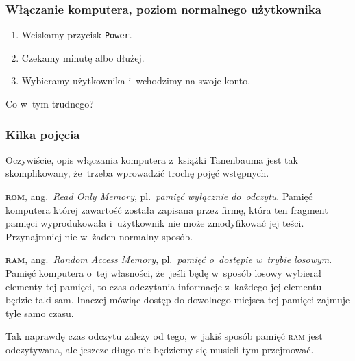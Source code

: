 \documentclass[10pt,t]{beamer}
\begin{document}
\begin{frame}
  \frametitle{Włączanie komputera, poziom normalnego użytkownika}


  \begin{enumerate}

  \item Wciskamy przycisk \texttt{Power}.



  \item Czekamy minutę albo dłużej.



  \item Wybieramy użytkownika i~wchodzimy na swoje konto.

  \end{enumerate}

  Co w~tym trudnego?

\end{frame}





\begin{frame}
  \frametitle{Kilka pojęcia}


  Oczywiście, opis włączania komputera z~książki Tanenbauma jest tak
  skomplikowany, że~trzeba wprowadzić trochę pojęć wstępnych.

  \textbf{\textsc{rom}}, ang.~\textit{Read Only Memory}, pl.~\textit{pamięć
    wyłącznie do~odczytu}. Pamięć komputera której zawartość została
  zapisana przez firmę, która ten fragment pamięci wyprodukowała
  i~użytkownik nie może zmodyfikować jej teści. Przynajmniej nie w~żaden
  normalny sposób.

  \textbf{\textsc{ram}}, ang.~\textit{Random Access Memory},
  pl.~\textit{pamięć o~dostępie w~trybie losowym}. Pamięć komputera o~tej
  własności, że~jeśli będę w~sposób losowy wybierał elementy tej pamięci,
  to czas odczytania informacje z~każdego jej elementu będzie taki sam.
  Inaczej mówiąc dostęp do dowolnego miejsca tej pamięci zajmuje tyle samo
  czasu.

  Tak naprawdę czas odczytu zależy od tego, w~jakiś sposób pamięć
  \textsc{ram} jest odczytywana, ale jeszcze długo nie będziemy się musieli
  tym przejmować.

\end{frame}
\end{document}
